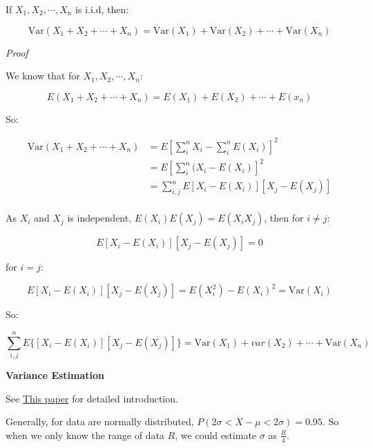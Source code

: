 \documentclass{article}
\newcommand{\Var}{\mathrm{Var}}
\begin{document}
If $X_1, X_2, \cdots, X_n$ is i.i.d, then:

\begin{equation}
\Var(X_1+X_2+\cdots+X_n)=\Var(X_1)+\Var(X_2)+\cdots+\Var(X_n)
\end{equation}

\textit{Proof}

We know that for $X_1, X_2, \cdots, X_n$:

\begin{equation}
E(X_1+X_2+\cdots+X_n)=E(X_1)+E(X_2)+\cdots+E(x_n)
\end{equation}

So:

\begin{equation*}
\begin{split}
  \Var(X_1+X_2+\cdots+X_n)&=E{[\sum_i^nX_i-\sum_i^nE(X_i)]^2}\\
  &=E{[\sum_i^n(X_i-E(X_i)]^2}\\
  &=\sum_{i,j}^nE{[X_i-E(X_i)][X_j-E(X_j)]}\\
\end{split}
\end{equation*}

As \(X_i\) and \(X_j\) is independent, \(E(X_i)E(X_j)=E(X_iX_j)\), then for \(i \neq j\):

\begin{equation}
E{[X_i-E(X_i)][X_j-E(X_j)]}=0
\end{equation}

for \(i=j\):

\begin{equation}
E{[X_i-E(X_i)][X_j-E(X_j)]}=E(X_i^2)-E(X_i)^2=\Var(X_i)
\end{equation}

So:

\begin{equation}
\sum_{i,j}^nE\{[X_i-E(X_i)][X_j-E(X_j)]\}=\Var(X_1)+var(X_2)+\cdots+\Var(X_n)
\end{equation}

\vspace{3mm}

\textbf{Variance Estimation}

See \href{https://bmcmedresmethodol.biomedcentral.com/articles/10.1186/1471-2288-5-13}{This paper} for
detailed introduction.

Generally, for data are normally distributed, \(P(2\sigma < X - \mu < 2\sigma) = 0.95\). So when we only know
the range of data \(R\), we could estimate \(\sigma\) as \(\frac{R}{4}\).
\end{document}

